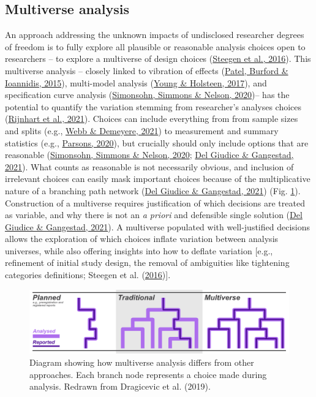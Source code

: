 \documentclass[10pt,a4paper]{article}
\begin{document}
\hypertarget{multiverse-analysis}{%
\subsection{Multiverse analysis}\label{multiverse-analysis}}

An approach addressing the unknown impacts of undisclosed researcher degrees of freedom is to fully explore all plausible or reasonable analysis choices open to researchers -- to explore a multiverse of design choices (\protect\hyperlink{ref-steegen_increasing_2016}{Steegen et al., 2016}).
This multiverse analysis -- closely linked to vibration of effects (\protect\hyperlink{ref-patel_assessment_2015}{Patel, Burford \& Ioannidis, 2015}), multi-model analysis (\protect\hyperlink{ref-young_model_2017}{Young \& Holsteen, 2017}), and specification curve analysis (\protect\hyperlink{ref-simonsohn_specification_2020}{Simonsohn, Simmons \& Nelson, 2020})-- has the potential to quantify the variation stemming from researcher's analyses choices (\protect\hyperlink{ref-rijnhart_assessing_2021}{Rijnhart et al., 2021}).
Choices can include everything from from sample sizes and splits (e.g., \protect\hyperlink{ref-webb_multiverse_2021}{Webb \& Demeyere, 2021}) to measurement and summary statistics (e.g., \protect\hyperlink{ref-parsons_exploring_2020}{Parsons, 2020}), but crucially should only include options that are reasonable (\protect\hyperlink{ref-simonsohn_specification_2020}{Simonsohn, Simmons \& Nelson, 2020}; \protect\hyperlink{ref-del_giudice_travelers_2021}{Del Giudice \& Gangestad, 2021}).
What counts as reasonable is not necessarily obvious, and inclusion of irrelevant choices can easily mask important choices because of the multiplicative nature of a branching path network (\protect\hyperlink{ref-del_giudice_travelers_2021}{Del Giudice \& Gangestad, 2021}) (Fig. \ref{fig:multiDiagram}).
Construction of a multiverse requires justification of which decisions are treated as variable, and why there is not an \emph{a priori} and defensible single solution (\protect\hyperlink{ref-del_giudice_travelers_2021}{Del Giudice \& Gangestad, 2021}).
A multiverse populated with well-justified decisions allows the exploration of which choices inflate variation between analysis universes, while also offering insights into how to deflate variation {[}e.g., refinement of initial study design, the removal of ambiguities like tightening categories definitions; Steegen et al. (\protect\hyperlink{ref-steegen_increasing_2016}{2016}){]}.

\begin{figure}
\includegraphics[width=1\linewidth]{../ext_images/Multiverse compared diagram updated} \caption{Diagram showing how multiverse analysis differs from other approaches. Each branch node represents a choice made during analysis. Redrawn from Dragicevic et al. (2019).}\label{fig:multiDiagram}
\end{figure}
\end{document}
